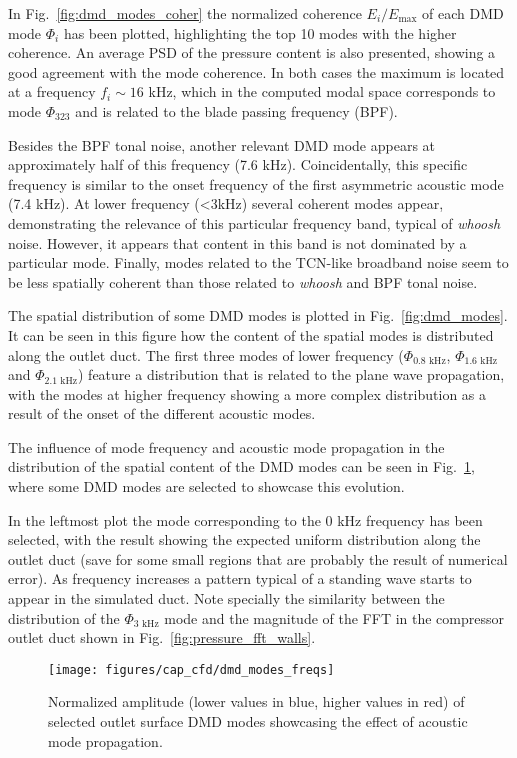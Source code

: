 In Fig.~\ref{fig:dmd_modes_coher} the normalized coherence $E_i/E_\text{max}$ of each DMD mode $\Phi_i$ has been plotted, highlighting the top 10 modes with the higher coherence. An average PSD of the pressure content is also presented, showing a good agreement with the mode coherence. In both cases the maximum is located at a frequency $f_i\sim 16$ kHz, which in the computed modal space corresponds to mode $\Phi_{323}$ and is related to the blade passing frequency (BPF).

Besides the BPF tonal noise, another relevant DMD mode appears at approximately half of this frequency (7.6 kHz). Coincidentally, this specific frequency is similar to the onset frequency of the first asymmetric acoustic mode (7.4 kHz). At lower frequency (<3kHz) several coherent modes appear, demonstrating the relevance of this particular frequency band, typical of \emph{whoosh} noise. However, it appears that content in this band is not dominated by a particular mode. Finally, modes related to the TCN-like broadband noise seem to be less spatially coherent than those related to \emph{whoosh} and BPF tonal noise.

The spatial distribution of some DMD modes is plotted in Fig.~\ref{fig:dmd_modes}. It can be seen in this figure how the content of the spatial modes is distributed along the outlet duct. The first three modes of lower frequency ($\Phi_\text{0.8 kHz}$, $\Phi_\text{1.6 kHz}$ and $\Phi_\text{2.1 kHz}$) feature a distribution that is related to the plane wave propagation, with the modes at higher frequency showing a more complex distribution as a result of the onset of the different acoustic modes.

The influence of mode frequency and acoustic mode propagation in the distribution of the spatial content of the DMD modes can be seen in Fig.~\ref{fig:dmd_modes_freqs}, where some DMD modes are selected to showcase this evolution. 

In the leftmost plot the mode corresponding to the 0 kHz frequency has been selected, with the result showing the expected uniform distribution along the outlet duct (save for some small regions that are probably the result of numerical error). As frequency increases a pattern typical of a standing wave starts to appear in the simulated duct. Note specially the similarity between the distribution of the $\Phi_\text{3 kHz}$ mode and the magnitude of the FFT in the compressor outlet duct shown in Fig.~\ref{fig:pressure_fft_walls}. 

\begin{figure}[t!]
\centering
\texttt{[image: figures/cap\_cfd/dmd\_modes\_freqs]}
\caption[Normalized amplitude of selected DMD modes (propagation)]{Normalized amplitude (lower values in blue, higher values in red) of selected outlet surface DMD modes showcasing the effect of acoustic mode propagation.}
\label{fig:dmd_modes_freqs}
\end{figure}

